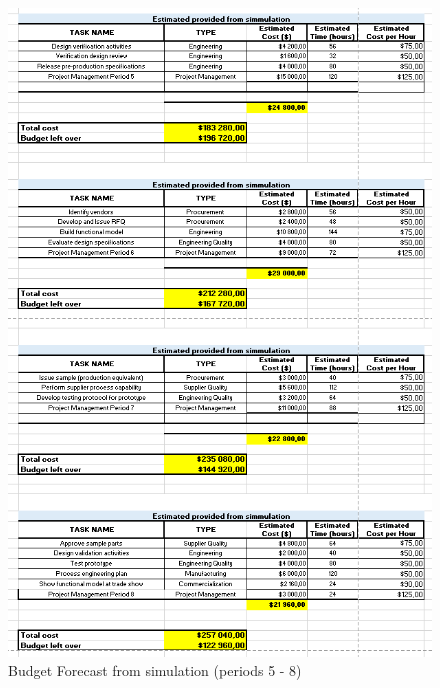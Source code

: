 \begin{appendices}
\begin{figure}[H]
\includegraphics[scale=0.8]{forecast/budget_forecast_sim_5678.PNG}
\caption{Budget Forecast from simulation (periods 5 - 8)}
\end{figure}
\begin{figure}[H]

\end{figure}
\end{appendices}
